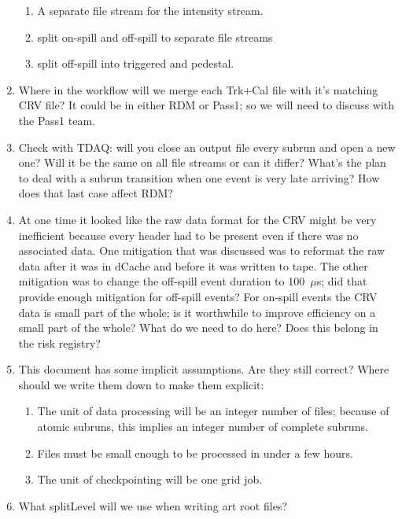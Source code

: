 \begin{enumerate}
\begin{enumerate}
      \item A separate file stream for the intensity stream.
      \item split on-spill and off-spill to separate file streams
      \item split off-spill into triggered and pedestal.
    \end{enumerate}
  \item Where in the workflow will we merge each Trk+Cal file with it's matching CRV file?
    It could be in either RDM or Pass1; so we will need to discuss with the Pass1 team.
  \item Check with TDAQ: will you close an output file every subrun and open a new one? Will it be the same
    on all file streams or can it differ?  What's the plan to deal with a subrun transition when one
    event is very late arriving?  How does that last case affect RDM?
  \item At one time it looked like the raw data format for the CRV might be very inefficient
    because every header had to be present even if there was no associated data.
    One mitigation that was discussed was to reformat the raw data after it was in dCache and before it was written to tape.
    The other mitigation was to change the off-spill event duration to 100~$\mu$s; did that provide enough mitigation for off-spill events?
    For on-spill events the CRV data is small part of the whole; is it worthwhile to improve efficiency on a small part of the whole?
    What do we need to do here?  Does this belong in the risk registry?
  \item This document has some implicit assumptions.  Are they still correct?  Where should we write them down to make them explicit:
    \begin{enumerate}
      \item The unit of data processing will be an integer number of files; because of atomic subruns, this implies an integer number
        of complete subruns.
      \item Files must be small enough to be processed in under a few hours.
      \item The unit of checkpointing will be one grid job.
    \end{enumerate}
 \item What splitLevel will we use when writing art root files?
\end{enumerate}
